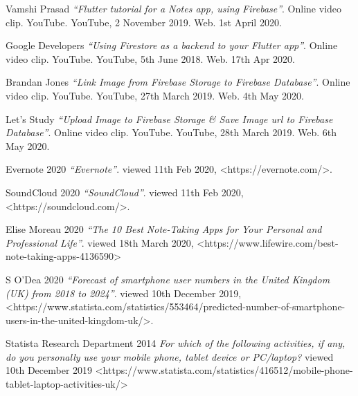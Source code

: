 \documentclass[oneside]{report}
\begin{document}

\begin{thebibliography}{9}
Vamshi Prasad
\textit{“Flutter tutorial for a Notes app, using Firebase”}. 
Online video clip. YouTube. YouTube, 2 November 2019. Web. 1st April 2020.

Google Developers
\textit{“Using Firestore as a backend to your Flutter app”}.
Online video clip. YouTube. YouTube, 5th June 2018. Web. 17th Apr 2020.

Brandan Jones
\textit{“Link Image from Firebase Storage to Firebase Database”}.
Online video clip. YouTube. YouTube, 27th March 2019. Web. 4th May 2020.

Let's Study
\textit{“Upload Image to Firebase Storage & Save Image url to Firebase Database”}.
Online video clip. YouTube. YouTube, 28th March 2019. Web. 6th May 2020.

Evernote 2020
\textit{“Evernote”}.
viewed 11th Feb 2020,
<https://evernote.com/>.

SoundCloud 2020
\textit{“SoundCloud”}.
viewed 11th Feb 2020, 
<https://soundcloud.com/>.

Elise Moreau 2020
\textit{“The 10 Best Note-Taking Apps for Your Personal and Professional Life”}.
viewed 18th March 2020,
<https://www.lifewire.com/best-note-taking-apps-4136590>

S O'Dea 2020
\textit{“Forecast of smartphone user numbers in the United Kingdom (UK) from 2018 to 2024”}.
viewed 10th December 2019,
<https://www.statista.com/statistics/553464/predicted-number-of-smartphone-users-in-the-united-kingdom-uk/>.

Statista Research Department 2014
\textit{For which of the following activities, if any, do you personally use your mobile phone, tablet device or PC/laptop?}
viewed 10th December 2019
<https://www.statista.com/statistics/416512/mobile-phone-tablet-laptop-activities-uk/>

\end{thebibliography}

\end{document}
